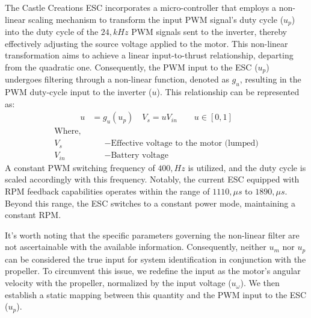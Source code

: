 The Castle Creations ESC incorporates a micro-controller that employs a non-linear scaling mechanism to transform the input PWM signal's duty cycle ($u_p$) into the duty cycle of the $24,kHz$ PWM signals sent to the inverter, thereby effectively adjusting the source voltage applied to the motor\cite{kim2017electric}. This non-linear transformation aims to achieve a linear input-to-thrust relationship, departing from the quadratic one. Consequently, the PWM input to the ESC ($u_p$) undergoes filtering through a non-linear function, denoted as $g_u$, resulting in the PWM duty-cycle input to the inverter ($u$). This relationship can be represented as:
\begin{align}\label{eqn::esc_input}
    u &= g_u(u_p)\quad
    V_s = u V_{in} \qquad u \in [0, 1]
\end{align}
\begin{align*}
\text{Where,}\qquad&\\
    V_s &- \text{Effective voltage to the motor (lumped)}\\
    V_{in} &- \text{Battery voltage}
\end{align*}
A constant PWM switching frequency of $400 , Hz$ is utilized, and the duty cycle is scaled accordingly with this frequency. Notably, the current ESC equipped with RPM feedback capabilities operates within the range of $1110 , \mu s$ to $1890 , \mu s$. Beyond this range, the ESC switches to a constant power mode, maintaining a constant RPM.

It's worth noting that the specific parameters governing the non-linear filter are not ascertainable with the available information. Consequently, neither $u_m$ nor $u_p$ can be considered the true input for system identification in conjunction with the propeller. To circumvent this issue, we redefine the input as the motor's angular velocity with the propeller, normalized by the input voltage ($u_\omega$). We then establish a static mapping between this quantity and the PWM input to the ESC ($u_p$).
